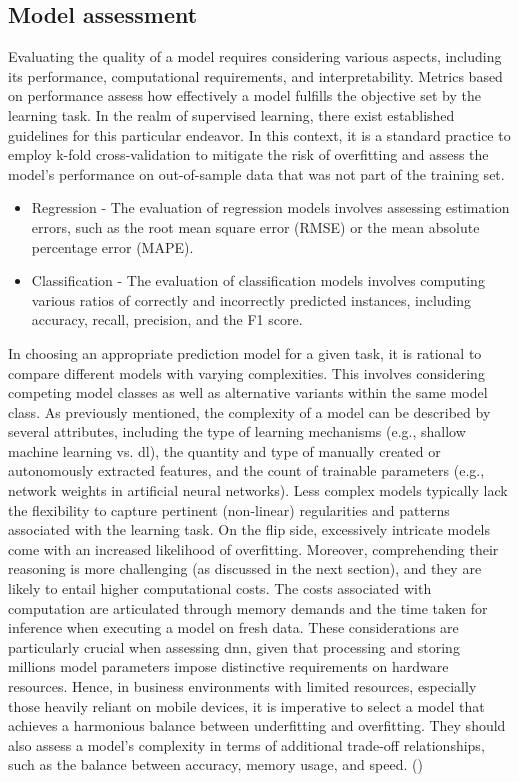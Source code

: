 \subsection{Model assessment}
Evaluating the quality of a model requires considering various aspects, including its performance, computational requirements, and interpretability. Metrics based on performance assess how effectively a model fulfills the objective set by the learning task. In the realm of supervised learning, there exist established guidelines for this particular endeavor. In this context, it is a standard practice to employ k-fold cross-validation to mitigate the risk of overfitting and assess the model's performance on out-of-sample data that was not part of the training set.

\begin{itemize}
\item
Regression - The evaluation of regression models involves assessing estimation errors, such as the root mean square error (RMSE) or the mean absolute percentage error (MAPE).

\item
Classification - The evaluation of classification models involves computing various ratios of correctly and incorrectly predicted instances, including accuracy, recall, precision, and the F1 score.

\end{itemize}

In choosing an appropriate prediction model for a given task, it is rational to compare different models with varying complexities. This involves considering competing model classes as well as alternative variants within the same model class. As previously mentioned, the complexity of a model can be described by several attributes, including the type of learning mechanisms (e.g., shallow machine learning vs. \acrshort{dl}), the quantity and type of manually created or autonomously extracted features, and the count of trainable parameters (e.g., network weights in artificial neural networks). Less complex models typically lack the flexibility to capture pertinent (non-linear) regularities and patterns associated with the learning task. On the flip side, excessively intricate models come with an increased likelihood of overfitting. Moreover, comprehending their reasoning is more challenging (as discussed in the next section), and they are likely to entail higher computational costs. The costs associated with computation are articulated through memory demands and the time taken for inference when executing a model on fresh data. These considerations are particularly crucial when assessing \acrshort{dnn}, given that processing and storing millions model parameters impose distinctive requirements on hardware resources. Hence, in business environments with limited resources, especially those heavily reliant on mobile devices, it is imperative to select a model that achieves a harmonious balance between underfitting and overfitting. 
They should also assess a model's complexity in terms of additional trade-off relationships, such as the balance between accuracy, memory usage, and speed.
\newline(\cite{janiesch2021machine})

